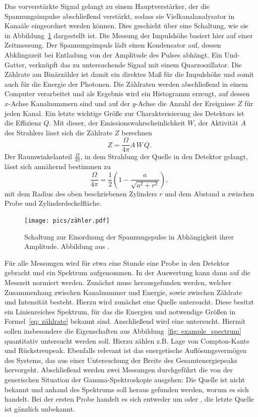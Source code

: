 Das vorverstärkte Signal gelangt zu einem Hauptverstärker, der die Spannungsimpulse abschließend verstärkt, sodass 
sie Vielkanalanalysator in Kanaäle eingeordnet werden können. Dies geschieht über eine Schaltung, wie sie in 
Abbildung~\ref{fig: zaehler}
dargestellt ist. Die Messung der Impulshöhe basiert hier auf einer Zeitmessung. Der Spannungsimpuls lädt einen 
Kondensator auf, dessen Abklingszeit bei Entladung von der Amplitude des Pulses abhängt. Ein Und-Gatter, verknüpft 
das zu untersuchende Signal mit einem Quarzoszillator. Die Zählrate am Binärzähler ist damit ein direktes Maß für 
die Impulshöhe und somit auch für die Energie der Photonen. 
Die Zählraten werden abschließend in einem Computer verarbeitet und als Ergebnis wird ein Histogramm erzeugt, auf dessen 
$x$-Achse Kanalnummern sind und auf der $y$-Achse die Anzahl der Ereignisse $Z$ für jeden Kanal. 
Ein letzte wichtige Größe zur Charakterisierung des Detektors ist 
die Effizienz $Q$. Mit dieser, der Emissionswahrscheinlichkeit $W$, der Aktivität $A$ des Strahlers lässt sich die 
Zählrate $Z$ berechnen 
\begin{equation}
    Z = \frac{\Omega}{4\pi} A \, W \, Q.
    \label{eq: zählrate}
\end{equation}
Der Raumwinkelanteil $\frac{\Omega}{4\pi}$, in dem Strahlung der Quelle in den Detektor gelangt, lässt sich annähernd bestimmen zu 
\begin{equation}
    \frac{\Omega}{4\pi} = \frac{1}{2} \left( 1 - \frac{a}{\sqrt{a^2 + r^2}} \right),
    \label{eq: omega}
\end{equation}
mit dem Radius des oben beschriebenen Zylinders $r$ und dem Abstand $a$ zwischen Probe und Zylinderdeckelfläche. 
\begin{figure}
    \centering
    \texttt{[image: pics/zähler.pdf]}
    \caption{Schaltung zur Einordnung der Spannungspulse in Abhängigkeit ihrer Amplitude. Abbildung aus \cite{anleitungv18}.}
    \label{fig: zaehler}
\end{figure}

Für alle Messungen wird für etwa eine Stunde eine Probe in den Detektor gebracht und ein Spektrum aufgenommen. In der 
Auswertung kann dann auf die Messzeit normiert werden. 
Zunächst muss herausgefunden werden, welcher Zusammenhang zwischen Kanalnummer und Energie, sowie zwischen Zählrate und 
Intensität besteht. Hierzu wird zunächst eine  Quelle untersucht. Diese besitzt ein Linienreiches Spektrum, für das 
die Energien und notwendige Größen in Formel~\eqref{eq: zählrate} bekannt sind. 
Anschließend wird eine  untersucht. Hiermit sollen insbesondere die Eigenschaften aus 
Abbildung~\ref{fig: example_spectrum} quantitativ untersucht werden soll. Hierzu zählen z.B. Lage von Compton-Kante und 
Rückstreupeak. Ebenfalls relevant ist das energetische Auflösungsvermögen des Systems, das aus einer Untersuchung der Breite 
des Gesamtenergiepeaks hervorgeht.
Abschließend werden zwei Messungen durchgeführt die von der generischen Situation der Gamma-Spektroskopie ausgehen: 
Die Quelle ist nicht bekannt und anhand des Spektrums soll heraus gefunden werden, worum es sich handelt. Bei der ersten 
Probe handelt es sich entweder um  oder , die letzte Quelle ist gänzlich unbekannt.